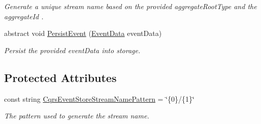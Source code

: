 \begin{DoxyCompactItemize}
\begin{DoxyCompactList}\small\item\em Generate a unique stream name based on the provided {\itshape aggregate\+Root\+Type}  and the {\itshape aggregate\+Id} . \end{DoxyCompactList}\item 
abstract void \hyperlink{classCqrs_1_1Events_1_1EventStore_aedb71ca0ddf21220e323bc60ad7508cd_aedb71ca0ddf21220e323bc60ad7508cd}{Persist\+Event} (\hyperlink{classCqrs_1_1Events_1_1EventData}{Event\+Data} event\+Data)
\begin{DoxyCompactList}\small\item\em Persist the provided {\itshape event\+Data}  into storage. \end{DoxyCompactList}\end{DoxyCompactItemize}
\subsection*{Protected Attributes}
\begin{DoxyCompactItemize}
\item 
const string \hyperlink{classCqrs_1_1Events_1_1EventStore_a1e6d87995d38d6fbb148388ec165a87e_a1e6d87995d38d6fbb148388ec165a87e}{Cqrs\+Event\+Store\+Stream\+Name\+Pattern} = \char`\"{}\{0\}/\{1\}\char`\"{}
\begin{DoxyCompactList}\small\item\em The pattern used to generate the stream name. \end{DoxyCompactList}\end{DoxyCompactItemize}
